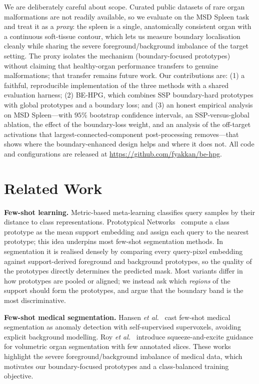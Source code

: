 \documentclass[conference]{IEEEtran}
\newcommand{\repourl}{https://github.com/fyakkan/be-hpg}
\begin{document}
We are deliberately careful about scope. Curated public datasets of rare organ malformations are
not readily available, so we evaluate on the MSD Spleen task and treat it as a \emph{proxy}: the
spleen is a single, anatomically consistent organ with a continuous soft-tissue contour, which
lets us measure boundary localisation cleanly while sharing the severe foreground/background
imbalance of the target setting. The proxy isolates the mechanism (boundary-focused prototypes)
without claiming that healthy-organ performance transfers to genuine malformations; that transfer
remains future work. Our contributions are: (1) a faithful, reproducible implementation of the
three methods with a shared evaluation harness; (2) BE-HPG, which combines SSP boundary-hard
prototypes with global prototypes and a boundary loss; and (3) an honest empirical analysis on
MSD Spleen---with $95\%$ bootstrap confidence intervals, an SSP-versus-global ablation, the
effect of the boundary-loss weight, and an analysis of the off-target activations that
largest-connected-component post-processing removes---that shows where the boundary-enhanced
design helps and where it does not. All code and configurations are released at \url{\repourl}.

\section{Related Work}
\textbf{Few-shot learning.} Metric-based meta-learning classifies query samples by their
distance to class representations. Prototypical Networks~\cite{snell2017prototypical} compute a
class prototype as the mean support embedding and assign each query to the nearest prototype;
this idea underpins most few-shot segmentation methods. In segmentation it is realised densely by
comparing every query-pixel embedding against support-derived foreground and background
prototypes, so the quality of the prototypes directly determines the predicted mask. Most variants
differ in how prototypes are pooled or aligned; we instead ask which \emph{regions} of the support
should form the prototypes, and argue that the boundary band is the most discriminative.

\textbf{Few-shot medical segmentation.} Hansen \emph{et al.}~\cite{hansen2022anomaly} cast
few-shot medical segmentation as anomaly detection with self-supervised supervoxels, avoiding
explicit background modelling. Roy \emph{et al.}~\cite{roy2020squeeze} introduce
squeeze-and-excite guidance for volumetric organ segmentation with few annotated slices. These
works highlight the severe foreground/background imbalance of medical data, which motivates our
boundary-focused prototypes and a class-balanced training objective.
\end{document}
